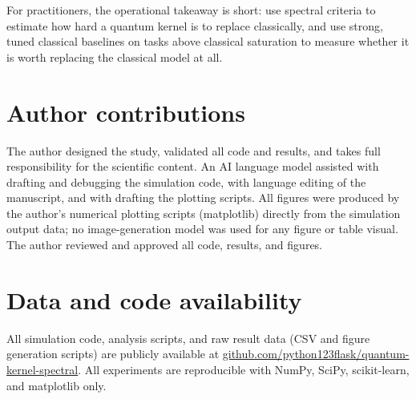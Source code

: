 \documentclass[aps,pra,preprint]{revtex4-2}
\begin{document}
For practitioners, the operational takeaway is short: use spectral criteria to
estimate how hard a quantum kernel is to replace classically, and use strong, tuned
classical baselines on tasks above classical saturation to measure whether it is worth
replacing the classical model at all.

\section*{Author contributions}
The author designed the study, validated all code and results, and takes full
responsibility for the scientific content. An AI language model assisted with
drafting and debugging the simulation code, with language editing of the manuscript,
and with drafting the plotting scripts. All figures were produced by the author's
numerical plotting scripts (matplotlib) directly from the simulation output data;
no image-generation model was used for any figure or table visual. The author
reviewed and approved all code, results, and figures.

\section*{Data and code availability}
All simulation code, analysis scripts, and raw result data (CSV and figure
generation scripts) are publicly available at
\href{https://github.com/python123flask/quantum-kernel-spectral}{github.com/python123flask/quantum-kernel-spectral}.
All experiments are reproducible with NumPy, SciPy, scikit-learn, and matplotlib only.



\end{document}
